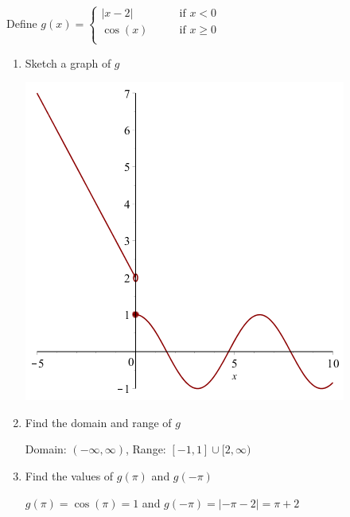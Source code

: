 \documentclass[handout]{ximera}
\begin{document}
\begin{instructorNotes}

\end{instructorNotes}

\begin{problem}
Define 
	$g(x) =   \left\{ \begin{array}{cl}
	|x-2|		 	&	\qquad \text{if } x < 0					\\
	\cos(x)			&	\qquad \text{if }  x \geq 0  	\\		\end{array} \right.  $
\begin{enumerate}	
	\item  Sketch a graph of $g$
		\begin{freeResponse} \hfil
			\begin{image}			
			\includegraphics{Figure6.png}
			\end{image}

		\end{freeResponse}

	\item  Find the domain and range of $g$
		\begin{freeResponse}	
			Domain: $(-\infty,\infty)$, Range: $[-1,1]\cup[2,\infty)$
		\end{freeResponse}		
	
	\item  Find the values of $g(\pi)$ and $g(-\pi)$
		\begin{freeResponse}	
			$g(\pi)=\cos (\pi)=1$ and $g(-\pi)=|-\pi-2|=\pi+2$
		\end{freeResponse}
	
	\end{enumerate}

\end{problem}
\end{document}
